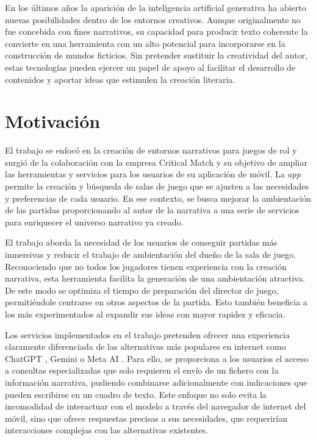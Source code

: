 En los últimos años la aparición de la inteligencia artificial generativa ha abierto nuevas posibilidades
dentro de los entornos creativos.
Aunque originalmente no fue concebida con fines narrativos, su capacidad para producir texto coherente
la convierte en una herramienta con un alto potencial para incorporarse en la construcción de mundos ficticios.
Sin pretender sustituir la creatividad del autor, estas tecnologías pueden ejercer un papel de apoyo
al facilitar el desarrollo de contenidos y aportar ideas que estimulen la creación literaria.


\section{Motivación}
El trabajo se enfocó en la creación de entornos narrativos para juegos de rol 
y surgió de la colaboración con la empresa Critical Match \cite{crit_match_web} y su objetivo de ampliar las herramientas 
y servicios para los usuarios de su aplicación de móvil.
La \textit{app} \cite{crit_match_app} permite la creación y búsqueda de salas de juego que se ajusten a las necesidades y preferencias de cada usuario.
En ese contexto, se busca mejorar la ambientación de las partidas proporcionando al autor de la narrativa a una serie de servicios
para enriquecer el universo narrativo ya creado.

El trabajo aborda la necesidad de los usuarios de conseguir partidas más inmersivas
y reducir el trabajo de ambientación del dueño de la sala de juego.
Reconociendo que no todos los jugadores tienen experiencia con la creación narrativa,
esta herramienta facilita la generación de una ambientación atractiva.
De este modo se optimiza el tiempo de preparación del director de juego, permitiéndole centrarse en otros aspectos de la partida.
Esto también beneficia a los más experimentados al expandir sus ideas con mayor rapidez y eficacia.

Los servicios implementados en el trabajo pretenden ofrecer una experiencia claramente diferenciada
de las alternativas más populares en internet como ChatGPT \cite{OpenAIChatGPT2022},
Gemini \cite{GeminiTeam2023Gemini} o Meta AI \cite{MetaAIAbout}.
Para ello, se proporciona a los usuarios el acceso a consultas especializadas que solo requieren el envío de un fichero
con la información narrativa, pudiendo combinarse adicionalmente con indicaciones que pueden escribirse en un cuadro de texto.
Este enfoque no solo evita la incomodidad de interactuar con el modelo a través del navegador de internet del móvil,
sino que ofrece respuestas precisas a sus necesidades, que requerirían interacciones complejas
con las alternativas existentes.

